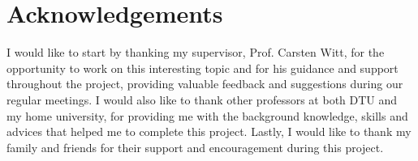 \section*{Acknowledgements}

I would like to start by thanking my supervisor, Prof. Carsten Witt, for the opportunity to work on this interesting topic and for his guidance and support throughout the project, providing
valuable feedback and suggestions during our regular meetings. I would also like to thank other professors at both DTU and my home university, for providing me with
the background knowledge, skills and advices that helped me to complete this project. Lastly, I would like to thank my family and friends for their support and encouragement during this project.
